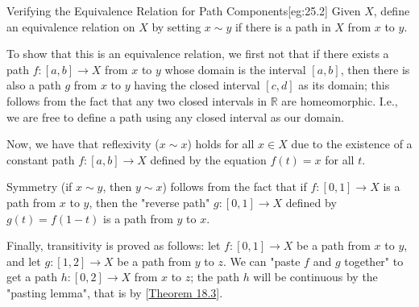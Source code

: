 \begin{egBox}{Verifying the Equivalence Relation for Path Components}[eg:25.2]
    Given \( X \), define an equivalence relation on \( X \) by setting 
    \( x \sim y \) if there is a path in \( X \) from \( x \) to \( y \).

    \baseSkip

    To show that this is an equivalence relation, we first not that if there 
    exists a path \( f: [ a, b ] \rightarrow X \) from \( x \) to \( y \)
    whose domain is the interval \( [ a, b ] \), then there is also a 
    path \( g \) from \( x \) to \( y \) having the closed interval 
    \( [ c, d ] \) as its domain; this follows from the fact that any two closed
    intervals in \( \mathbb{R} \) are homeomorphic.
    I.e., we are free to define a path using any closed interval as our 
    domain.

    \baseSkip
    
    Now, we have that reflexivity (\( x \sim x \)) holds for all \( x \in X \)
    due to the existence of a constant path \( f: [ a, b ] \rightarrow X \)
    defined by the equation \( f ( t ) = x \) for all \( t \).

    \baseSkip

    Symmetry (if \( x \sim y \), then \( y \sim x \)) follows from the fact that
    if \( f: [ 0, 1 ] \rightarrow X \) is a path from \( x \) to \( y \), then 
    the "reverse path" \( g: [ 0, 1 ] \rightarrow X \) defined by 
    \( g ( t ) = f ( 1 - t ) \) is a path from \( y \) to \( x \).

    \baseSkip

    Finally, transitivity is proved as follows: let 
    \( f: [ 0, 1 ] \rightarrow X \) be a path from \( x \) to \( y \), and 
    let \( g: [ 1, 2 ] \rightarrow X \) be a path from \( y \) to \( z \).
    We can "paste \( f \) and \( g \) together" to get a path 
    \( h: [ 0, 2 ] \rightarrow X \) from \( x \) to \( z \); the path \( h \)
    will be continuous by the "pasting lemma", that is by
    [\hyperlink{thm:18.3}{Theorem 18.3}].
\end{egBox}

